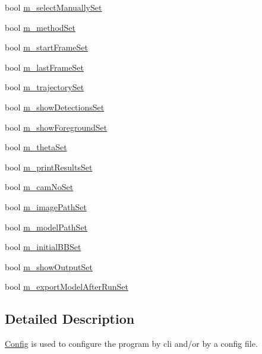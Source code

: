 \begin{DoxyCompactItemize}
\item 
bool \hyperlink{classtld_1_1Config_ac9b4f0739710476e605e210a5034ec05}{m\-\_\-select\-Manually\-Set}
\item 
bool \hyperlink{classtld_1_1Config_a5e9e3986bc7c358b2873dd504e431e76}{m\-\_\-method\-Set}
\item 
bool \hyperlink{classtld_1_1Config_ad687474e03c708cb894c22f3fe945c06}{m\-\_\-start\-Frame\-Set}
\item 
bool \hyperlink{classtld_1_1Config_af8ca60a6ed0416150c2ff42ce03826f5}{m\-\_\-last\-Frame\-Set}
\item 
bool \hyperlink{classtld_1_1Config_a15524b83cfa73659aad6a2113ccd1b61}{m\-\_\-trajectory\-Set}
\item 
bool \hyperlink{classtld_1_1Config_aad85246fc8376bc6e3e6b7e21a24a6a0}{m\-\_\-show\-Detections\-Set}
\item 
bool \hyperlink{classtld_1_1Config_a120216f53831c7066c0e54c9c1b2bdaf}{m\-\_\-show\-Foreground\-Set}
\item 
bool \hyperlink{classtld_1_1Config_afdb22a0de5e6f0a2bda59be3c01db38c}{m\-\_\-theta\-Set}
\item 
bool \hyperlink{classtld_1_1Config_aaf7ca6a043ed777f86a3f3554f766b54}{m\-\_\-print\-Results\-Set}
\item 
bool \hyperlink{classtld_1_1Config_a02c8e73d04439a88f1c89557b3aae875}{m\-\_\-cam\-No\-Set}
\item 
bool \hyperlink{classtld_1_1Config_a7677f68cd2ec4065796424d2386ff294}{m\-\_\-image\-Path\-Set}
\item 
bool \hyperlink{classtld_1_1Config_a293320dc272ffbdfac03fa09b3a6cd66}{m\-\_\-model\-Path\-Set}
\item 
bool \hyperlink{classtld_1_1Config_a75217fc93a9503fe55e0ed1a172e4380}{m\-\_\-initial\-B\-B\-Set}
\item 
bool \hyperlink{classtld_1_1Config_a73f08ef2700b5109fadc8370d81083e0}{m\-\_\-show\-Output\-Set}
\item 
bool \hyperlink{classtld_1_1Config_aaca6f6dea56dfb8ad8627c41fd1dd8ed}{m\-\_\-export\-Model\-After\-Run\-Set}
\end{DoxyCompactItemize}



\subsection{Detailed Description}
\hyperlink{classtld_1_1Config}{Config} is used to configure the program by cli and/or by a config file. 

